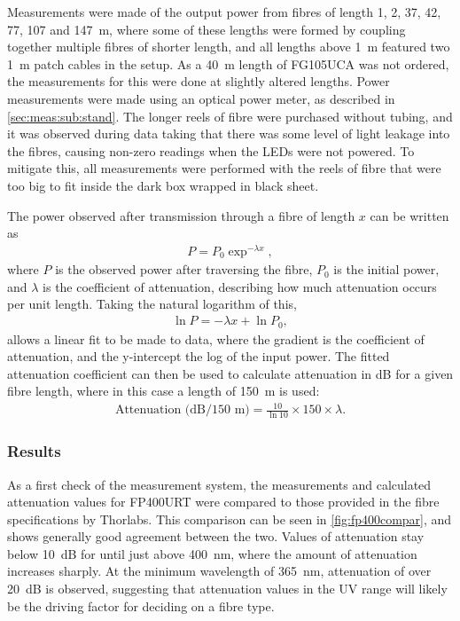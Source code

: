 \documentclass[a4paper,11pt]{article}
\begin{document}
Measurements were made of the output power from fibres of length 1, 2, 37, 42, 77, 107 and 147~m, where some of these lengths were formed by coupling together multiple fibres of shorter length, and all lengths above 1~m featured two 1~m patch cables in the setup. As a 40~m length of FG105UCA was not ordered, the measurements for this were done at slightly altered lengths. Power measurements were made using an optical power meter, as described in \cref{sec:meas:sub:stand}. The longer reels of fibre were purchased without tubing, and it was observed during data taking that there was some level of light leakage into the fibres, causing non-zero readings when the LEDs were not powered. To mitigate this, all measurements were performed with the reels of fibre that were too big to fit inside the dark box wrapped in black sheet.

The power observed after transmission through a fibre of length $x$ can be written as
\begin{eqnarray}
P = P_0\exp^{-\lambda x},
\end{eqnarray}
where $P$ is the observed power after traversing the fibre, $P_0$ is the initial power, and $\lambda$ is the coefficient of attenuation, describing how much attenuation occurs per unit length. Taking the natural logarithm of this,
\begin{eqnarray}
\ln P = -\lambda x + \ln P_0,
\end{eqnarray}
allows a linear fit to be made to data, where the gradient is the coefficient of attenuation, and the y-intercept the log of the input power. The fitted attenuation coefficient can then be used to calculate attenuation in dB for a given fibre length, where in this case a length of 150~m is used:
\begin{eqnarray}
\text{Attenuation (dB/150~m)} = \frac{10}{\ln 10}\times 150 \times \lambda.
\end{eqnarray}

\subsubsection{Results}
As a first check of the measurement system, the measurements and calculated attenuation values for FP400URT were compared to those provided in the fibre specifications by Thorlabs. This comparison can be seen in \cref{fig:fp400compar}, and shows generally good agreement between the two. Values of attenuation stay below 10~dB for until just above 400~nm, where the amount of attenuation increases sharply. At the minimum wavelength of 365~nm, attenuation of over 20~dB is observed, suggesting that attenuation values in the UV range will likely be the driving factor for deciding on a fibre type.
\end{document}

